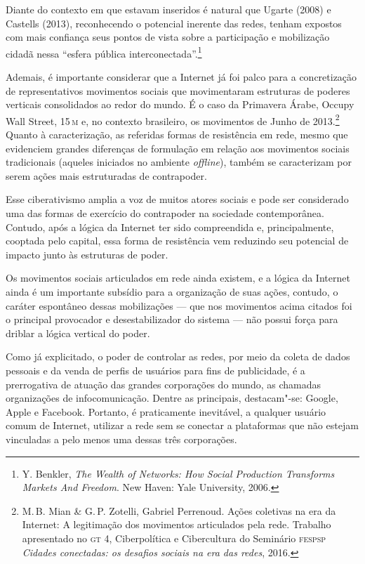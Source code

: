 Diante do contexto em que estavam inseridos é natural que Ugarte (2008)
e Castells (2013), reconhecendo o potencial inerente das redes, tenham
expostos com mais confiança seus pontos de vista sobre a participação e
mobilização cidadã nessa ``esfera pública interconectada''.\footnote{Y. Benkler, \textit{The Wealth of Networks: How Social Production Transforms Markets And Freedom}. New Haven: Yale University, 2006.}

Ademais, é importante considerar que a Internet já foi palco para a
concretização de representativos movimentos sociais que movimentaram
estruturas de poderes verticais consolidados ao redor do mundo. É o caso
da Primavera Árabe, Occupy Wall Street, 15\,\textsc{m} e, no contexto
brasileiro, os movimentos de Junho de 2013.\footnote{M.\,B. Mian \&  G.\,P. Zotelli, Gabriel Perrenoud. Ações
coletivas na era da Internet: A legitimação dos movimentos articulados
pela rede. Trabalho apresentado no \textsc{gt} 4, Ciberpolítica e Cibercultura
do Seminário \textsc{fespsp} \textit{Cidades conectadas: os desafios sociais na era das
redes}, 2016.}
Quanto à caracterização, as referidas formas de resistência em rede,
mesmo que evidenciem grandes diferenças de formulação em relação aos
movimentos sociais tradicionais (aqueles iniciados no ambiente
\textit{offline}), também se caracterizam por serem ações mais estruturadas de
contrapoder.

Esse ciberativismo amplia a voz de muitos atores sociais e pode ser
considerado uma das formas de exercício do contrapoder na sociedade
contemporânea. Contudo, após a lógica da Internet ter sido compreendida
e, principalmente, cooptada pelo capital, essa forma de resistência vem
reduzindo seu potencial de impacto junto às estruturas de poder.

Os movimentos sociais articulados em rede ainda existem, e a lógica da
Internet ainda é um importante subsídio para a organização de suas
ações, contudo, o caráter espontâneo dessas mobilizações --- que nos
movimentos acima citados foi o principal provocador e desestabilizador
do sistema --- não possui força para driblar a lógica vertical do poder.

Como já explicitado, o poder de controlar as redes, por meio da coleta
de dados pessoais e da venda de perfis de usuários para fins de
publicidade, é a prerrogativa de atuação das grandes corporações do
mundo, as chamadas organizações de infocomunicação. Dentre as
principais, destacam"-se: Google, Apple e Facebook. Portanto, é
praticamente inevitável, a qualquer usuário comum de Internet, utilizar
a rede sem se conectar a plataformas que não estejam vinculadas a pelo
menos uma dessas três corporações.

